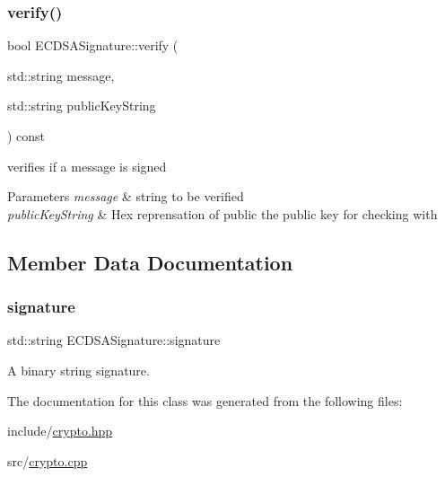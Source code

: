 \subsubsection{\texorpdfstring{verify()}{verify()}}
{\footnotesize\ttfamily bool E\+C\+D\+S\+A\+Signature\+::verify (\begin{DoxyParamCaption}\item[{std\+::string}]{message,  }\item[{std\+::string}]{public\+Key\+String }\end{DoxyParamCaption}) const}



verifies if a message is signed 


\begin{DoxyParams}{Parameters}
{\em message} & string to be verified \\
\hline
{\em public\+Key\+String} & Hex reprensation of public the public key for checking with \\
\hline
\end{DoxyParams}


\subsection{Member Data Documentation}
\mbox{\label{classECDSASignature_aae4afcd90bbe797c9c60fb6967dd0849}} 
\subsubsection{\texorpdfstring{signature}{signature}}
{\footnotesize\ttfamily std\+::string E\+C\+D\+S\+A\+Signature\+::signature\hspace{0.3cm}{\ttfamily [private]}}



A binary string signature. 



The documentation for this class was generated from the following files\+:\begin{DoxyCompactItemize}
\item 
include/\mbox{\hyperlink{crypto_8hpp}{crypto.\+hpp}}\item 
src/\mbox{\hyperlink{crypto_8cpp}{crypto.\+cpp}}\end{DoxyCompactItemize}
